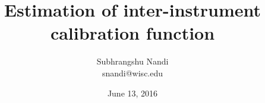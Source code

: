 \documentclass[12pt]{article}
\begin{document}
\title{Estimation of inter-instrument calibration function}

\author{Subhrangshu Nandi \\
	snandi@wisc.edu}
\date{June 13, 2016}

\maketitle









%
\end{document}
